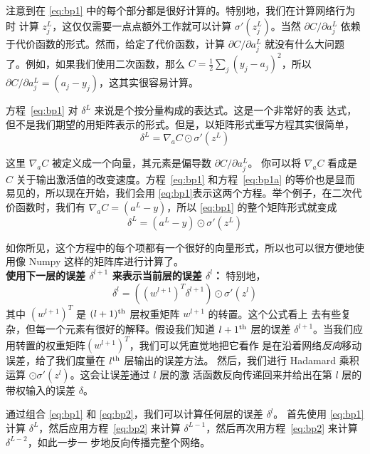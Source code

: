 注意到在 \eqref{eq:bp1} 中的每个部分都是很好计算的。特别地，我们在计算网络行为时
计算 $z_j^L$，这仅仅需要一点点额外工作就可以计算 $\sigma'(z_j^L)$。当然
$\partial C/\partial a_j^L$ 依赖于代价函数的形式。然而，给定了代价函数，计算
$\partial C/\partial a_j^L$ 就没有什么大问题了。例如，如果我们使用二次函数，那么
$C = \frac{1}{2} \sum_j(y_j-a_j)^2$，所以 $\partial C/\partial a_j^L = (a_j -
y_j)$，这其实很容易计算。

方程~\eqref{eq:bp1} 对 $\delta^L$ 来说是个按分量构成的表达式。这是一个非常好的表
达式，但不是我们期望的用矩阵表示的形式。但是，以矩阵形式重写方程其实很简单，
\begin{equation}
  \delta^L = \nabla_a C \odot \sigma'(z^L)
  \label{eq:bp1a}\tag{BP1a}
\end{equation}

这里 $\nabla_a C$ 被定义成一个向量，其元素是偏导数 $\partial C/\partial a_j^L$。
你可以将 $\nabla_a C$ 看成是 $C$ 关于输出激活值的改变速度。方程~\eqref{eq:bp1}
和方程~\eqref{eq:bp1a} 的等价也是显而易见的，所以现在开始，我们会用
\eqref{eq:bp1}表示这两个方程。举个例子，在二次代价函数时，我们有 $\nabla_a C =
(a^L - y)$，所以 \eqref{eq:bp1} 的整个矩阵形式就变成
\begin{equation}
  \delta^L = (a^L-y) \odot \sigma'(z^L)
  \label{eq:30}\tag{30}
\end{equation}

如你所见，这个方程中的每个项都有一个很好的向量形式，所以也可以很方便地使用像
Numpy 这样的矩阵库进行计算了。\\

\textbf{使用下一层的误差 $\delta^{l+1}$ 来表示当前层的误差 $\delta^l$：} 特别地，
\begin{equation}
  \delta^l = ((w^{l+1})^T \delta^{l+1}) \odot \sigma'(z^l)
  \label{eq:bp2}\tag{BP2}
\end{equation}
其中 $(w^{l+1})^T$ 是 $(l+1)^{\rm th}$ 层权重矩阵 $w^{l+1}$ 的转置。这个公式看上
去有些复杂，但每一个元素有很好的解释。假设我们知道 $l+1^{\rm th}$ 层的误差
$\delta^{l+1}$。当我们应用转置的权重矩阵$(w^{l+1})^T$，我们可以凭直觉地把它看作
是在沿着网络\emph{反向}移动误差，给了我们度量在 $l^{\rm th}$ 层输出的误差方法。
然后，我们进行 Hadamard 乘积运算 $\odot \sigma'(z^l)$。这会让误差通过 $l$ 层的激
活函数反向传递回来并给出在第 $l$ 层的带权输入的误差 $\delta$。

通过组合 \eqref{eq:bp1} 和 \eqref{eq:bp2}，我们可以计算任何层的误差 $\delta^l$。
首先使用 \eqref{eq:bp1} 计算 $\delta^L$，然后应用方程~\eqref{eq:bp2} 来计算
$\delta^{L-1}$，然后再次用方程~\eqref{eq:bp2} 来计算 $\delta^{L-2}$，如此一步一
步地反向传播完整个网络。\\

